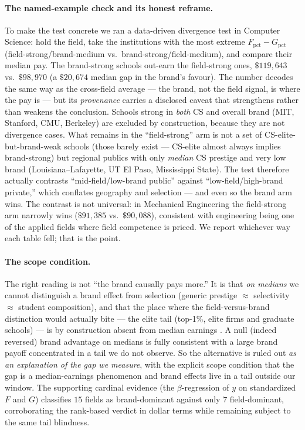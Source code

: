 \documentclass[11pt]{article}
\begin{document}
\paragraph{The named-example check and its honest reframe.} To make the test concrete we ran a data-driven divergence test in Computer Science: hold the field, take the institutions with the most extreme $F_{\mathrm{pct}} - G_{\mathrm{pct}}$ (field-strong/brand-medium vs.\ brand-strong/field-medium), and compare their median pay. The brand-strong schools out-earn the field-strong ones, $\$119{,}643$ vs.\ $\$98{,}970$ (a $\$20{,}674$ median gap in the brand's favour). The number decodes the same way as the cross-field average --- the brand, not the field signal, is where the pay is --- but its \emph{provenance} carries a disclosed caveat that strengthens rather than weakens the conclusion. Schools strong in \emph{both} CS and overall brand (MIT, Stanford, CMU, Berkeley) are excluded by construction, because they are not divergence cases. What remains in the ``field-strong'' arm is not a set of CS-elite-but-brand-weak schools (those barely exist --- CS-elite almost always implies brand-strong) but regional publics with only \emph{median} CS prestige and very low brand (Louisiana--Lafayette, UT El Paso, Mississippi State). The test therefore actually contrasts ``mid-field/low-brand public'' against ``low-field/high-brand private,'' which conflates geography and selection --- and even so the brand arm wins. The contrast is not universal: in Mechanical Engineering the field-strong arm narrowly wins ($\$91{,}385$ vs.\ $\$90{,}088$), consistent with engineering being one of the applied fields where field competence is priced. We report whichever way each table fell; that is the point.

\paragraph{The scope condition.} The right reading is not ``the brand causally pays more.'' It is that \emph{on medians} we cannot distinguish a brand effect from selection (generic prestige $\approx$ selectivity $\approx$ student composition), and that the place where the field-versus-brand distinction would actually bite --- the elite tail (top-1\%, elite firms and graduate schools) --- is by construction absent from median earnings \citep{chetty2023diversifying}. A null (indeed reversed) brand advantage on medians is fully consistent with a large brand payoff concentrated in a tail we do not observe. So the alternative is ruled out \emph{as an explanation of the gap we measure}, with the explicit scope condition that the gap is a median-earnings phenomenon and brand effects live in a tail outside our window. The supporting cardinal evidence (the $\beta$-regression of $y$ on standardized $F$ and $G$) classifies $15$ fields as brand-dominant against only $7$ field-dominant, corroborating the rank-based verdict in dollar terms while remaining subject to the same tail blindness.
\end{document}
